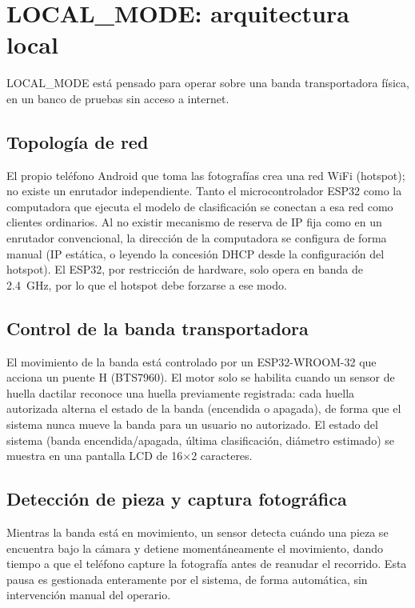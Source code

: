 \section{LOCAL\_MODE: arquitectura local}
\label{sec:local_mode}

LOCAL\_MODE está pensado para operar sobre una banda transportadora
física, en un banco de pruebas sin acceso a internet.

\subsection{Topología de red}
El propio teléfono Android que toma las fotografías crea una red WiFi
(hotspot); no existe un enrutador independiente. Tanto el
microcontrolador ESP32 como la computadora que ejecuta el modelo de
clasificación se conectan a esa red como clientes ordinarios. Al no
existir mecanismo de reserva de IP fija como en un enrutador
convencional, la dirección de la computadora se configura de forma
manual (IP estática, o leyendo la concesión DHCP desde la
configuración del hotspot). El ESP32, por restricción de hardware,
solo opera en banda de 2.4~GHz, por lo que el hotspot debe forzarse a
ese modo.

\subsection{Control de la banda transportadora}
El movimiento de la banda está controlado por un ESP32-WROOM-32 que
acciona un puente H (BTS7960). El motor solo se habilita cuando un
sensor de huella dactilar reconoce una huella previamente registrada:
cada huella autorizada alterna el estado de la banda (encendida o
apagada), de forma que el sistema nunca mueve la banda para un usuario
no autorizado. El estado del sistema (banda encendida/apagada, última
clasificación, diámetro estimado) se muestra en una pantalla LCD de
16$\times$2 caracteres.

\subsection{Detección de pieza y captura fotográfica}
Mientras la banda está en movimiento, un sensor detecta cuándo una
pieza se encuentra bajo la cámara y detiene momentáneamente el
movimiento, dando tiempo a que el teléfono capture la fotografía antes
de reanudar el recorrido. Esta pausa es gestionada enteramente por el
sistema, de forma automática, sin intervención manual del operario.

